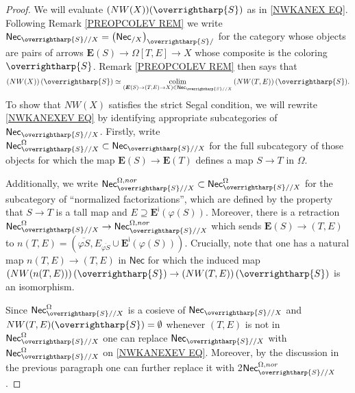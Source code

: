 \documentclass[a4paper,10pt
,draft
]{article}%
\numberwithin{equation}{section}
\numberwithin{figure}{section}
\theoremstyle{definition} %
\newcommand{\vect}[1]{\text{\overrightharp{\ensuremath{#1}}}}
\DeclareMathOperator{\colim}{colim}%
\newcommand{\1}{\ensuremath{\mathbbm 1}}%
\begin{document}
\begin{proof}
	We will evaluate 
	$(NW(X))(\vect{S})$ as in \eqref{NWKANEX EQ}.
	Following Remark \ref{PREOPCOLEV REM}
	we write
	$\mathsf{Nec}_{\vect{S}//X}
	=
	\left(\mathsf{Nec}_{/X}\right)_{\vect{S}/}$
	for the category
	whose objects are pairs of arrows
	$\boldsymbol{E}(S) \to \Omega[T,E] \to X$
	whose composite is the coloring $\vect{S}$.
	Remark \ref{PREOPCOLEV REM} then says that
\begin{equation}\label{NWKANEXEV EQ}
\left(NW(X)\right)(\vect{S}) \simeq
\underset{(\boldsymbol{E}(S) \to (T,E) \to X)
	\in \mathsf{Nec}_{\vect{S}//X}}{\colim}
\left(NW(T,E)\right)(\vect{S}).
\end{equation}
To show that $NW(X)$ satisfies the strict Segal condition, 
we will rewrite \eqref{NWKANEXEV EQ} 
by identifying appropriate subcategories of
$\mathsf{Nec}_{\vect{S}//X}$.
Firstly, write
$\mathsf{Nec}_{\vect{S}//X}^{\Omega}
\subset
\mathsf{Nec}_{\vect{S}//X}$
for the full subcategory of those objects for which the map
$\boldsymbol{E}(S) \to \boldsymbol{E}(T)$
defines a map $S \to T$ in $\Omega$.

Additionally, we write 
$
\mathsf{Nec}_{\vect{S}//X}^{\Omega,nor}
	\subset
\mathsf{Nec}_{\vect{S}//X}^{\Omega}
$
for the subcategory of ``normalized factorizations'',
which are defined by the property that
$S \to T$ is a tall map and
$E \supseteq \boldsymbol{E}^{\mathsf{i}}(\varphi(S))$.
Moreover, 
there is a retraction
$
	\mathsf{Nec}_{\vect{S}//X}^{\Omega}
\to
	\mathsf{Nec}_{\vect{S}//X}^{\Omega,nor}
$
which sends
$\boldsymbol{E}(S) \to (T,E)$ to
$n(T,E)=(\overline{\varphi S},
E_{\overline{\varphi S}} \cup \boldsymbol{E}^{\mathsf{i}}(\varphi(S)))$.
Crucially, note that one has a natural map
$n(T,E) \to (T,E)$ in $\mathsf{Nec}$
for which the induced map
$\left(NW(n(T,E))\right)(\vect{S}) \to
\left(NW(T,E)\right)(\vect{S})$
is an isomorphism.

Since 
$\mathsf{Nec}_{\vect{S}//X}^{\Omega}$
is a cosieve of 
$\mathsf{Nec}_{\vect{S}//X}$
and 
$NW(T,E)(\vect{S}) = \emptyset$
whenever $(T,E)$ is not in 
$\mathsf{Nec}_{\vect{S}//X}^{\Omega}$
one can replace 
$\mathsf{Nec}_{\vect{S}//X}$
with 
$\mathsf{Nec}_{\vect{S}//X}^{\Omega}$
on
\eqref{NWKANEXEV EQ}.
Moreover, by the discussion in the previous paragraph one can further replace it with
2$\mathsf{Nec}_{\vect{S}//X}^{\Omega,nor}$.


\end{proof}
\end{document}
